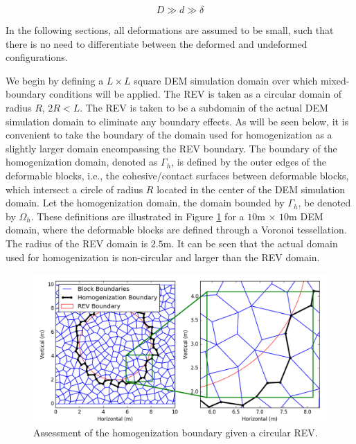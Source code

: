 \begin{equation}
\label{eqn:scalesep}
D\gg d\gg\delta
\end{equation}

In the following sections, all deformations are assumed to be small, such that there is no need to differentiate between the deformed and undeformed configurations.  

We begin by defining a $L\times L$ square DEM simulation domain over which mixed-boundary conditions will be applied. The REV is taken as a circular domain of radius $R$, $2R<L$.  The REV is taken to be a subdomain of the actual DEM simulation domain to eliminate any boundary effects.  As will be seen below, it is convenient to take the boundary of the domain used for homogenization as a slightly larger domain encompassing the REV boundary. The boundary of the homogenization domain, denoted as $\Gamma_h$, is defined by the outer edges of the deformable blocks, i.e., the cohesive/contact surfaces between deformable blocks, which intersect a circle of radius $R$ located in the center of the DEM simulation domain. Let the homogenization domain, the domain bounded by $\Gamma_h$, be denoted by $\Omega_h$. These definitions are illustrated in Figure \ref{fig:homoarea} for a $10$m $\times$ $10$m DEM domain, where the deformable blocks are defined through a Voronoi tessellation. The radius of the REV domain is $2.5$m.  It can be seen that the actual domain used for homogenization is non-circular and larger than the REV domain. 

\begin{figure}[!htb]
\begin{center}
\includegraphics[width=\textwidth]{figures/Chapter3/HomogenizationArea}
\caption{{\label{fig:homoarea}Assessment of the homogenization boundary given a circular REV.%
}}
\end{center}
\end{figure}


